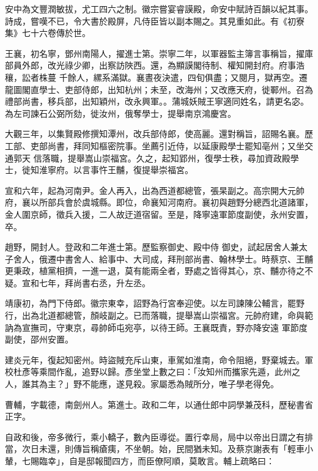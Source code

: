 \begin{pinyinscope}
 安中為文豐潤敏拔，尤工四六之制。徽宗嘗宴睿謨殿，命安中賦詩百韻以紀其事。詩成，嘗嘆不已，令大書於殿屏，凡侍臣皆以副本賜之。其見重如此。有《初寮集》七十六卷傳於世。



 王襄，初名寧，鄧州南陽人，擢進士第。崇寧二年，以軍器監主簿言事稱旨，擢庫部員外郎，改光祿少卿，出察訪陜西。還，為顯謨閣待制、權知開封府。府事浩穰，訟者株蔓
 千餘人，縲系滿獄。襄晝夜決遣，四旬俱盡；又閱月，獄再空。遷龍圖閣直學士、吏部侍郎，出知杭州；未至，改海州；又改應天府，徙鄆州。召為禮部尚書，移兵部，出知穎州，改永興軍。。蒲城妖賊王寧適同姓名，請更名宓。為左司諫石公弼所劾，徙汝州，俄奪學士，提舉南京鴻慶宮。



 大觀三年，以集賢殿修撰知潭州，改兵部侍郎，使高麗。還對稱旨，詔賜名襄。歷工部、吏部尚書，拜同知樞密院事。坐薦引近侍，以延康殿學士罷知亳州；又坐交通郭天
 信落職，提舉嵩山崇福宮。久之，起知郢州，復學士秩，尋加資政殿學士，徙知淮寧府。以言事忤王黼，復提舉崇福宮。



 宣和六年，起為河南尹。金人再入，出為西道都總管，張杲副之。高宗開大元帥府，襄以所部兵會於虞城縣。即位，命襄知河南府。襄初與趙野分總西北道諸軍，金人圍京師，徵兵入援，二人故迂道宿留。至是，降寧遠軍節度副使，永州安置，卒。



 趙野，開封人。登政和二年進士第。歷監察御史、殿中侍
 御史，試起居舍人兼太子舍人，俄遷中書舍人、給事中、大司成，拜刑部尚書、翰林學士。時蔡京、王黼更秉政，植黨相擠，一進一退，莫有能兩全者，野處之皆得其心，京、黼亦待之不疑。宣和七年，拜尚書右丞，升左丞。



 靖康初，為門下侍郎。徽宗東幸，詔野為行宮奉迎使。以左司諫陳公輔言，罷野行，出為北道都總管，顏岐副之。已而落職，提舉嵩山崇福宮。元帥府建，命與範訥為宣撫司，守東京，尋帥師屯宛亭，以待王師。王襄既責，野亦降安遠
 軍節度副使，邵州安置。



 建炎元年，復起知密州。時盜賊充斥山東，車駕如淮南，命令阻絕，野棄城去。軍校杜彥等乘間作亂，追野以歸。彥坐堂上數之曰：「汝知州而攜家先遁，此州之人，誰其為主？」野不能應，遂見殺。家屬悉為賊所分，唯子學老得免。



 曹輔，字載德，南劍州人。第進士。政和二年，以通仕郎中詞學兼茂科，歷秘書省正字。



 自政和後，帝多微行，乘小轎子，數內臣導從。置行幸局，局中以帝出日謂之有排
 當，次日未還，則傳旨稱瘡痍，不坐朝。始，民間猶未知。及蔡京謝表有「輕車小輦，七賜臨幸」，自是邸報聞四方，而臣僚阿順，莫敢言。輔上疏略曰：




\end{pinyinscope}
